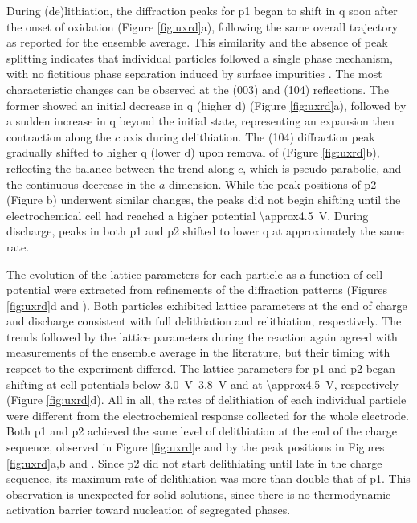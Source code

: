 \documentclass{article}
\begin{document}
During (de)lithiation, the diffraction peaks for \gls{p1} began to
shift in \gls{q} soon after the onset of oxidation (Figure
\ref{fig:uxrd}a), following the same overall trajectory as reported
for the ensemble average\cite{robert2015}. This similarity and the
absence of peak splitting indicates that individual particles followed
a single phase mechanism, with no fictitious phase separation induced
by surface impurities \cite{grenier2017}. The most characteristic
changes can be observed at the (003) and (104) reflections. The former
showed an initial decrease in \gls{q} (higher \gls{d}) (Figure
\ref{fig:uxrd}a), followed by a sudden increase in \gls{q} beyond the
initial state, representing an expansion then contraction along the
$c$ axis during delithiation\cite{robert2015}. The (104) diffraction
peak gradually shifted to higher \gls{q} (lower \gls{d}) upon removal
of  (Figure \ref{fig:uxrd}b), reflecting the balance between
the trend along $c$, which is pseudo-parabolic, and the continuous
decrease in the $a$ dimension.\cite{robert2015} While the peak
positions of \gls{p2} (Figure b) underwent
similar changes, the peaks did not begin shifting until the
electrochemical cell had reached a higher potential
\SI{\approx4.5}{\volt}. During discharge, peaks in both \gls{p1} and
\gls{p2} shifted to lower \gls{q} at approximately the same rate.

The evolution of the lattice parameters for each particle as a
function of cell potential were extracted from refinements of the
diffraction patterns (Figures \ref{fig:uxrd}d and
). Both particles exhibited lattice parameters
at the end of charge and discharge consistent with full delithiation
and relithiation, respectively\cite{novak2015}. The trends followed by
the lattice parameters during the reaction again agreed with
measurements of the ensemble average in the literature\cite{novak2015,
  faenza2018}, but their timing with respect to the experiment
differed. The lattice parameters for \gls{p1} and \gls{p2} began
shifting at cell potentials below \SIrange{3.0}{3.8}{\volt} and at
\SI{\approx4.5}{\volt}, respectively (Figure \ref{fig:uxrd}d). All in
all, the rates of delithiation of each individual particle were
different from the electrochemical response collected for the whole
electrode. Both \gls{p1} and \gls{p2} achieved the same level of
delithiation at the end of the charge sequence, observed in Figure
\ref{fig:uxrd}e and by the peak positions in Figures \ref{fig:uxrd}a,b
and . Since \gls{p2} did not start delithiating
until late in the charge sequence, its maximum rate of delithiation
was more than double that of \gls{p1}. This observation is unexpected
for solid solutions, since there is no thermodynamic activation
barrier toward nucleation of segregated phases.
\end{document}

